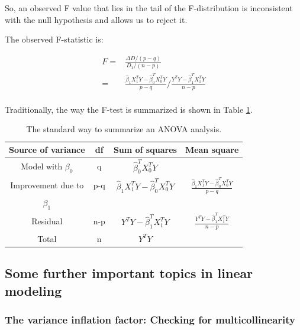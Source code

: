 \documentclass[12pt,]{krantz}
\begin{document}
So, an observed F value that lies in the tail of the F-distribution is inconsistent with the null hypothesis and allows us to reject it.

The observed F-statistic is:

\begin{equation}
\begin{split}
F=&\frac{\Delta D/(p-q)}{D_1/(n-p)} \\
=& \frac{\hat \beta_1 X_1^T Y - \hat \beta_0^T X_0^T Y}{p-q} /
\frac{Y^T Y - \hat \beta_1^T X_1^TY}{n-p}\\
\end{split}
\end{equation}

Traditionally, the way the F-test is summarized is shown in Table \ref{tab:anovasummary}.

\begin{table}[!htbp]
\caption{The standard way to summarize an ANOVA analysis.}
\begin{center}
\begin{tabular}{|c|c|c|c|}
\hline
Source of variance & df & Sum of squares & Mean square\\
\hline
Model with $\beta_0$ & q & $\hat\beta_0^T X_0^T Y$ & \\
Improvement due to & p-q & $\hat \beta_1 X_1^T Y - \hat \beta_0^T X_0^T Y$ & $\frac{\hat \beta_1 X_1^T Y - \hat \beta_0^T X_0^T Y}{p-q}$\\
$\beta_1$ & & & \\
Residual & n-p & $Y^T Y - \hat \beta_1^T X_1^TY$  & $\frac{Y^T Y - \hat \beta_1^T X_1^TY}{n-p}$\\
\hline
Total & n & $Y^T Y$ & \\
\hline
\end{tabular}
\end{center}
\label{tab:anovasummary}
\end{table}

\hypertarget{some-further-important-topics-in-linear-modeling}{%
\subsection{Some further important topics in linear modeling}\label{some-further-important-topics-in-linear-modeling}}

\hypertarget{the-variance-inflation-factor-checking-for-multicollinearity}{%
\subsubsection{The variance inflation factor: Checking for multicollinearity}\label{the-variance-inflation-factor-checking-for-multicollinearity}}
\end{document}
